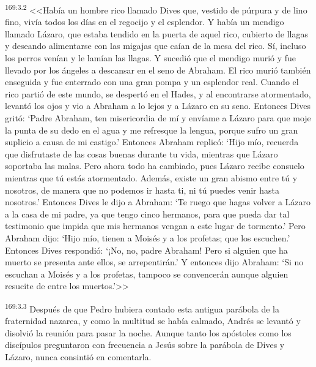 \par 
\textsuperscript{169:3.2} <<Había un hombre rico llamado Dives que, vestido de púrpura y de lino fino, vivía todos los días en el regocijo y el esplendor. Y había un mendigo llamado Lázaro, que estaba tendido en la puerta de aquel rico, cubierto de llagas y deseando alimentarse con las migajas que caían de la mesa del rico. Sí, incluso los perros venían y le lamían las llagas. Y sucedió que el mendigo murió y fue llevado por los ángeles a descansar en el seno de Abraham. El rico murió también enseguida y fue enterrado con una gran pompa y un esplendor real. Cuando el rico partió de este mundo, se despertó en el Hades, y al encontrarse atormentado, levantó los ojos y vio a Abraham a lo lejos y a Lázaro en su seno. Entonces Dives gritó: `Padre Abraham, ten misericordia de mí y envíame a Lázaro para que moje la punta de su dedo en el agua y me refresque la lengua, porque sufro un gran suplicio a causa de mi castigo.' Entonces Abraham replicó: `Hijo mío, recuerda que disfrutaste de las cosas buenas durante tu vida, mientras que Lázaro soportaba las malas. Pero ahora todo ha cambiado, pues Lázaro recibe consuelo mientras que tú estás atormentado. Además, existe un gran abismo entre tú y nosotros, de manera que no podemos ir hasta ti, ni tú puedes venir hasta nosotros.' Entonces Dives le dijo a Abraham: `Te ruego que hagas volver a Lázaro a la casa de mi padre, ya que tengo cinco hermanos, para que pueda dar tal testimonio que impida que mis hermanos vengan a este lugar de tormento.' Pero Abraham dijo: {}`Hijo mío, tienen a Moisés y a los profetas; que los escuchen.' Entonces Dives respondió: `¡No, no, padre Abraham! Pero si alguien que ha muerto se presenta ante ellos, se arrepentirán.' Y entonces dijo Abraham: `Si no escuchan a Moisés y a los profetas, tampoco se convencerán aunque alguien resucite de entre los muertos.'>>

\par 
\textsuperscript{169:3.3} Después de que Pedro hubiera contado esta antigua parábola de la fraternidad nazarea, y como la multitud se había calmado, Andrés se levantó y disolvió la reunión para pasar la noche. Aunque tanto los apóstoles como los discípulos preguntaron con frecuencia a Jesús sobre la parábola de Dives y Lázaro, nunca consintió en comentarla.

